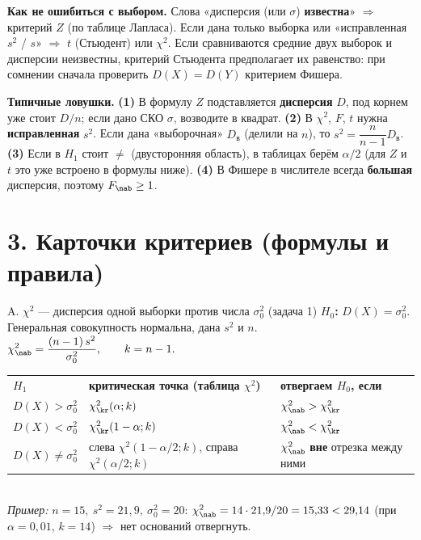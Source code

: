 \begin{warn}\small
\textbf{Как не ошибиться с выбором.} Слова «дисперсия (или $\sigma$) \textbf{известна}» $\Rightarrow$ критерий $Z$ (по таблице Лапласа). Если дана только выборка или «исправленная $s^2$ / $s$» $\Rightarrow$ $t$ (Стьюдент) или $\chi^2$. Если сравниваются средние двух выборок и дисперсии неизвестны, критерий Стьюдента предполагает их равенство: при сомнении сначала проверить $D(X)=D(Y)$ критерием Фишера.
\end{warn}

\begin{warn}\small
\textbf{Типичные ловушки.}
\textbf{(1)} В формулу $Z$ подставляется \textbf{дисперсия} $D$, под корнем уже стоит $D/n$; если дано СКО $\sigma$, возводите в квадрат. \;
\textbf{(2)} В $\chi^2$, $F$, $t$ нужна \textbf{исправленная} $s^2$. Если дана «выборочная» $D_{\text{в}}$ (делили на $n$), то $s^2=\dfrac{n}{n-1}D_{\text{в}}$. \;
\textbf{(3)} Если в $H_1$ стоит $\ne$ (двусторонняя область), в таблицах берём \textbf{$\alpha/2$} (для $Z$ и $t$ это уже встроено в формулы ниже). \;
\textbf{(4)} В Фишере в числителе всегда \textbf{большая} дисперсия, поэтому $F_{\nab}\ge 1$.
\end{warn}

\newpage
\section*{3. Карточки критериев (формулы и правила)}
\renewcommand{\arraystretch}{1.15}

\begin{card}{A. $\chi^2$ --- дисперсия одной выборки против числа $\sigma_0^2$ \hfill (задача 1)}
\textbf{$H_0$:} $D(X)=\sigma_0^2$. \quad Генеральная совокупность нормальна, дана $s^2$ и $n$.\\
$\displaystyle \chi^2_{\nab}=\frac{(n-1)\,s^2}{\sigma_0^2},\qquad k=n-1.$\\
\begin{tabular}{@{}p{3.4cm}p{5.6cm}p{7.8cm}@{}}
\textbf{$H_1$} & \textbf{критическая точка (таблица $\chi^2$)} & \textbf{отвергаем $H_0$, если} \\
$D(X)>\sigma_0^2$ & $\chi^2_\kr(\alpha;k)$ & $\chi^2_{\nab}>\chi^2_\kr$ \\
$D(X)<\sigma_0^2$ & $\chi^2_\kr(1-\alpha;k)$ & $\chi^2_{\nab}<\chi^2_\kr$ \\
$D(X)\ne\sigma_0^2$ & слева $\chi^2(1-\alpha/2;k)$, справа $\chi^2(\alpha/2;k)$ & $\chi^2_{\nab}$ \textbf{вне} отрезка между ними \\
\end{tabular}\\
\emph{Пример:} $n=15,\ s^2=21{,}9,\ \sigma_0^2=20$: $\chi^2_{\nab}=14\cdot21{,}9/20=15{,}33<29{,}14$ (при $\alpha=0{,}01$, $k=14$) $\Rightarrow$ нет оснований отвергнуть.
\end{card}

